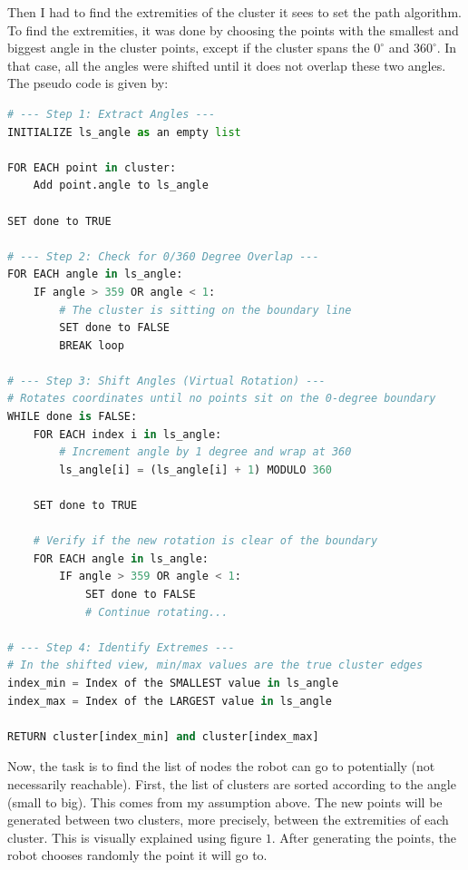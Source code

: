 \documentclass{article}
\begin{document}
Then I had to find the extremities of the cluster it sees to set the path algorithm. To find the extremities, it was done by choosing the points with the smallest and biggest angle in the cluster points, except if the cluster spans the $0^\circ$ and $360^\circ$. In that case, all the angles were shifted until it does not overlap these two angles. The pseudo code is given by:
\begin{lstlisting}[language=Python, caption=Finding Cluster Extremities with Wrap-around Handling]
# --- Step 1: Extract Angles ---
INITIALIZE ls_angle as an empty list

FOR EACH point in cluster:
    Add point.angle to ls_angle
    
SET done to TRUE

# --- Step 2: Check for 0/360 Degree Overlap ---
FOR EACH angle in ls_angle:
    IF angle > 359 OR angle < 1:
        # The cluster is sitting on the boundary line
        SET done to FALSE
        BREAK loop
        
# --- Step 3: Shift Angles (Virtual Rotation) ---
# Rotates coordinates until no points sit on the 0-degree boundary
WHILE done is FALSE:
    FOR EACH index i in ls_angle:
        # Increment angle by 1 degree and wrap at 360
        ls_angle[i] = (ls_angle[i] + 1) MODULO 360
        
    SET done to TRUE
    
    # Verify if the new rotation is clear of the boundary
    FOR EACH angle in ls_angle:
        IF angle > 359 OR angle < 1:
            SET done to FALSE
            # Continue rotating...
            
# --- Step 4: Identify Extremes ---
# In the shifted view, min/max values are the true cluster edges
index_min = Index of the SMALLEST value in ls_angle
index_max = Index of the LARGEST value in ls_angle

RETURN cluster[index_min] and cluster[index_max]
\end{lstlisting}

Now, the task is to find the list of nodes the robot can go to potentially (not necessarily reachable). First, the list of clusters are sorted according to the angle (small to big). This comes from my assumption above. The new points will be generated between two clusters, more precisely, between the extremities of each cluster. This is visually explained using figure $1$. After generating the points, the robot chooses randomly the point it will go to.\\
\end{document}
